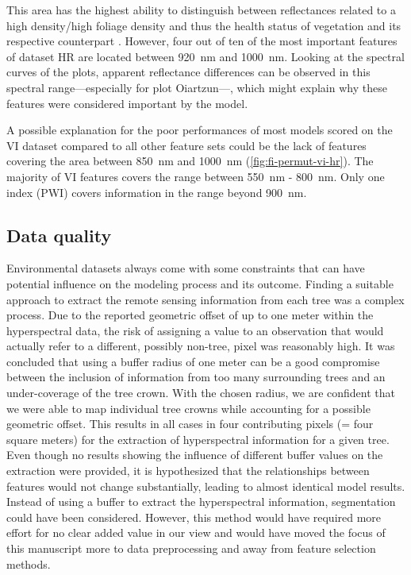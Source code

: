 \documentclass[remotesensing,article,submit,moreauthors,pdftex]{Definitions/mdpi}
\begin{document}
This area has the highest ability to distinguish between reflectances related to a high density/high foliage density and thus the health status of vegetation and its respective counterpart \cite{horler1983}.
However, four out of ten of the most important features of dataset HR are located between 920~nm and 1000~nm.
Looking at the spectral curves of the plots, apparent reflectance differences can be observed in this spectral range---especially for plot Oiartzun---, which might explain why these features were considered important by the model.

A possible explanation for the poor performances of most models scored on the VI dataset compared to all other feature sets could be the lack of features covering the area between 850~nm and 1000~nm (\autoref{fig:fi-permut-vi-hr}).
The majority of VI features covers the range between 550~nm - 800~nm.
Only one index (PWI) covers information in the range beyond 900~nm.

\subsection{Data quality}
\label{subsec:data-quality}

Environmental datasets always come with some constraints that can have potential influence on the modeling process and its outcome.
Finding a suitable approach to extract the remote sensing information from each tree was a complex process.
Due to the reported geometric offset of up to one meter within the hyperspectral data, the risk of assigning a value to an observation that would actually refer to a different, possibly non-tree, pixel was reasonably high.
It was concluded that using a buffer radius of one meter can be a good compromise between the inclusion of information from too many surrounding trees and an under-coverage of the tree crown.
With the chosen radius, we are confident that we were able to map individual tree crowns while accounting for a possible geometric offset.
This results in all cases in four contributing pixels (= four square meters) for the extraction of hyperspectral information for a given tree.
Even though no results showing the influence of different buffer values on the extraction were provided, it is hypothesized that the relationships between features would not change substantially, leading to almost identical model results.
Instead of using a buffer to extract the hyperspectral information, segmentation could have been considered.
However, this method would have required more effort for no clear added value in our view and would have moved the focus of this manuscript more to data preprocessing and away from feature selection methods.
\end{document}
